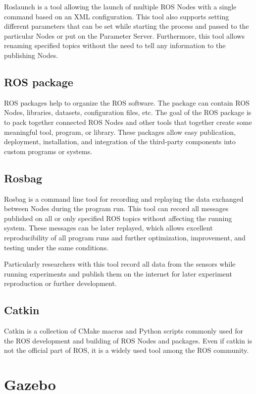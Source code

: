 Roslaunch is a tool allowing the launch of multiple ROS Nodes with a single command based on an XML configuration. This tool also supports setting different parameters that can be set while starting the process and passed to the particular Nodes or put on the Parameter Server. Furthermore, this tool allows renaming specified topics without the need to tell any information to the publishing Nodes.

\subsection*{ROS package}

ROS packages help to organize the ROS software. The package can contain ROS Nodes, libraries, datasets, configuration files, etc. The goal of the ROS package is to pack together connected ROS Nodes and other tools that together create some meaningful tool, program, or library. These packages allow easy publication, deployment, installation, and integration of the third-party components into custom programs or systems.

\subsection*{Rosbag}

Rosbag is a command line tool for recording and replaying the data exchanged between Nodes during the program run. This tool can record all messages published on all or only specified ROS topics without affecting the running system. These messages can be later replayed, which allows excellent reproducibility of all program runs and further optimization, improvement, and testing under the same conditions.\par
Particularly researchers with this tool record all data from the sensors while running experiments and publish them on the internet for later experiment reproduction or further development.

\subsection*{Catkin}

Catkin is a collection of CMake macros and Python scripts commonly used for the ROS development and building of ROS Nodes and packages. Even if catkin is not the official part of ROS, it is a widely used tool among the ROS community.

\section{Gazebo}\label{section:gazebo}

